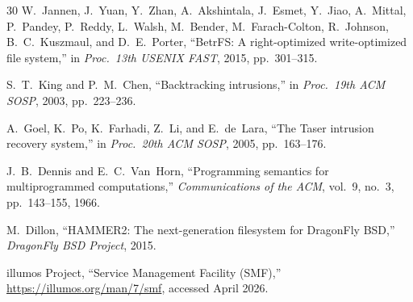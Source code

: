 \documentclass[11pt,a4paper]{article}
\theoremstyle{definition}
\theoremstyle{remark}
\begin{document}
\begin{thebibliography}{30}
W.~Jannen, J.~Yuan, Y.~Zhan, A.~Akshintala, J.~Esmet, Y.~Jiao,
A.~Mittal, P.~Pandey, P.~Reddy, L.~Walsh, M.~Bender, M.~Farach-Colton,
R.~Johnson, B.~C.~Kuszmaul, and D.~E.~Porter,
``BetrFS: A right-optimized write-optimized file system,''
in \emph{Proc.\ 13th USENIX FAST}, 2015, pp.~301--315.

S.~T.~King and P.~M.~Chen,
``Backtracking intrusions,''
in \emph{Proc.\ 19th ACM SOSP}, 2003, pp.~223--236.

A.~Goel, K.~Po, K.~Farhadi, Z.~Li, and E.~de~Lara,
``The Taser intrusion recovery system,''
in \emph{Proc.\ 20th ACM SOSP}, 2005, pp.~163--176.

J.~B.~Dennis and E.~C.~Van~Horn,
``Programming semantics for multiprogrammed computations,''
\emph{Communications of the ACM}, vol.~9, no.~3, pp.~143--155, 1966.

M.~Dillon,
``HAMMER2: The next-generation filesystem for DragonFly BSD,''
\emph{DragonFly BSD Project}, 2015.

{illumos Project},
``Service Management Facility (SMF),''
\url{https://illumos.org/man/7/smf}, accessed April 2026.

\end{thebibliography}
\end{document}
